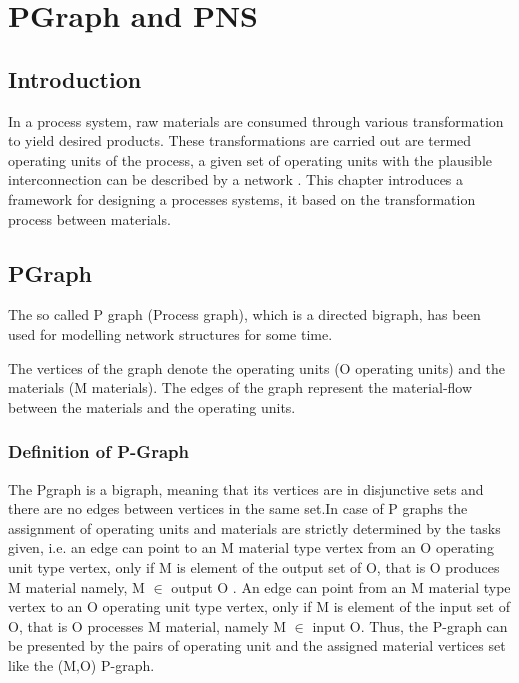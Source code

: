 
\chapter{\label{cha:pgraph}PGraph and PNS}

 
\section{Introduction}

In a process system, raw materials are consumed through various transformation to yield desired products. These transformations are carried out are termed operating units of the process, a given set of operating units with the plausible interconnection can be described by a network \cite{omacs0}. 
This chapter introduces a framework for designing a processes systems, it based on the transformation process between materials.

\section{PGraph}


The so called P graph (Process graph), which is a directed bigraph, 
has been used for modelling network structures for some time.

The vertices of the graph denote the operating units (O operating units) and the materials (M materials).
The edges of the graph represent the material-flow between the materials and the operating units\cite{pns2, pns4}. 

\subsection{Definition of P-Graph}

The Pgraph is a bigraph, meaning that its vertices are in disjunctive sets 
and there are no edges between vertices in the same set.In case of P graphs the assignment of operating units and materials are strictly determined by the tasks given, i.e. an edge can point to an M material type vertex 
from an O operating unit type vertex, only if M is element of the output set of O, 
that is O produces M material namely, M $\in$ output O \cite{pns2}. 
An edge can point from an M material type vertex to an O operating unit type vertex, 
only if M is element of the input set of O, that is O processes M material, namely M $\in$ input O. Thus, the P-graph can be presented by the pairs of operating unit and the assigned material vertices set like the (M,O) P-graph\cite{pns2}.

